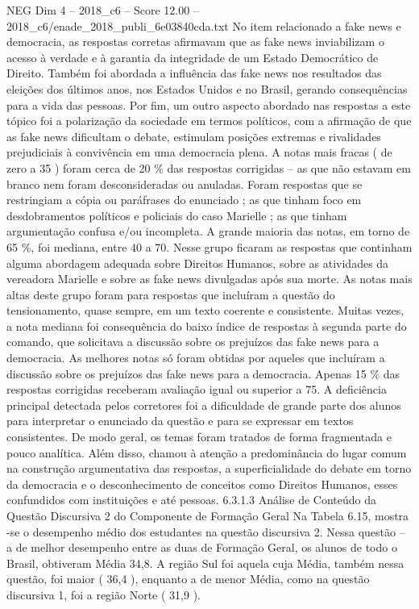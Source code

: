 \begin{textsample}{NEG Dim 4 – 2018\_c6 – Score 12.00 – 2018\_c6/enade\_2018\_publi\_6e03840cda.txt}
No item relacionado a fake news e democracia, as respostas corretas afirmavam que as fake news inviabilizam o acesso à verdade e à garantia da integridade de um Estado Democrático de Direito.
Também foi abordada a influência das fake news nos resultados das eleições dos últimos anos, nos Estados Unidos e no Brasil, gerando consequências para a vida das pessoas.
Por fim, um outro aspecto abordado nas respostas a este tópico foi a polarização da sociedade em termos políticos, com a afirmação de que as fake news dificultam o debate, estimulam posições extremas e rivalidades prejudiciais à convivência em uma democracia plena.
A notas mais fracas ( de zero a 35 ) foram cerca de 20 \% das respostas corrigidas – as que não estavam em branco nem foram desconsideradas ou anuladas.
Foram respostas que se restringiam a cópia ou paráfrases do enunciado ; as que tinham foco em desdobramentos políticos e policiais do caso Marielle ; as que tinham argumentação confusa e/ou incompleta.
A grande maioria das notas, em torno de 65 \%, foi mediana, entre 40 a 70.
Nesse grupo ficaram as respostas que continham alguma abordagem adequada sobre Direitos Humanos, sobre as atividades da vereadora Marielle e sobre as fake news divulgadas após sua morte.
As notas mais altas deste grupo foram para respostas que incluíram a questão do tensionamento, quase sempre, em um texto coerente e consistente.
Muitas vezes, a nota mediana foi consequência do baixo índice de respostas à segunda parte do comando, que solicitava a discussão sobre os prejuízos das fake news para a democracia.
As melhores notas só foram obtidas por aqueles que incluíram a discussão sobre os prejuízos das fake news para a democracia.
Apenas 15 \% das respostas corrigidas receberam avaliação igual ou superior a 75.
A deficiência principal detectada pelos corretores foi a dificuldade de grande parte dos alunos para interpretar o enunciado da questão e para se expressar em textos consistentes.
De modo geral, os temas foram tratados de forma fragmentada e pouco analítica.
Além disso, chamou à atenção a predominância do lugar comum na construção argumentativa das respostas, a superficialidade do debate em torno da democracia e o desconhecimento de conceitos como Direitos Humanos, esses confundidos com instituições e até pessoas. 6.3.1.3 Análise de Conteúdo da Questão Discursiva 2 do Componente de Formação Geral Na Tabela 6.15, mostra -se o desempenho médio dos estudantes na questão discursiva 2.
Nessa questão – a de melhor desempenho entre as duas de Formação Geral, os alunos de todo o Brasil, obtiveram Média 34,8.
A região Sul foi aquela cuja Média, também nessa questão, foi maior ( 36,4 ), enquanto a de menor Média, como na questão discursiva 1, foi a região Norte ( 31,9 ).

\end{textsample}
